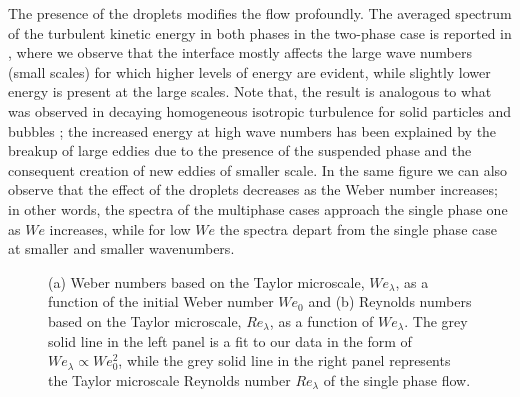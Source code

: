 The presence of the droplets modifies the flow profoundly. The averaged spectrum of the turbulent kinetic energy in both phases in the two-phase case is reported in , where we observe that the interface mostly affects the large wave numbers (small scales) for which higher levels of energy are evident, while slightly lower energy is present at the large scales. Note that, the result is analogous to what was observed in decaying homogeneous isotropic turbulence for solid particles \citep{lucci_ferrante_elghobashi_2010a} and bubbles \citep{dodd_ferrante_2016a}; the increased energy at high wave numbers has been explained by the breakup of large eddies due to the presence of the suspended phase and the consequent creation of new eddies of smaller scale. In the same figure we can also observe that the effect of the droplets decreases as the Weber number increases; in other words, the spectra of the multiphase cases approach the single phase one as $We$ increases, while for low $We$ the spectra depart from the single phase case at smaller and smaller wavenumbers.

\begin{figure}
	\centering
	 \hspace{0.5cm}
	 \vspace{0.5cm}
	\caption{(a) Weber numbers based on the Taylor microscale, $We_\lambda$, as a function of the initial Weber number $We_0$ and (b) Reynolds numbers based on the Taylor microscale, $Re_\lambda$, as a function of $We_\lambda$. The grey solid line in the left panel is a fit to our data in the form of $We_\lambda \propto We_0^2$, while the grey solid line in the right panel represents the Taylor microscale Reynolds number $Re_\lambda$ of the single phase flow.}
	\label{fig:rey}
\end{figure}


